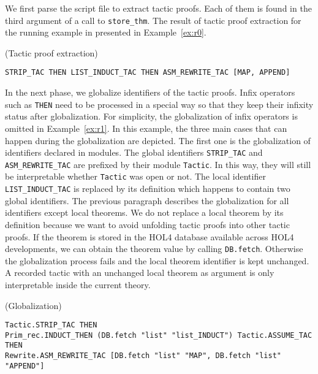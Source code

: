\documentclass[runningheads,a4paper,draft]{svjour3}
\def\holfour{\textsf{HOL4}\xspace}
\begin{document}
We first parse the script file to extract tactic proofs. Each of them is found in
the third argument of a call to \texttt{store\_thm}. The result of tactic proof
extraction for the running example in presented in Example~\ref{ex:r0}.

\begin{example}\label{ex:r0}(Tactic proof extraction)
\small
\begin{lstlisting}[language=SMLSmall]
STRIP_TAC THEN LIST_INDUCT_TAC THEN ASM_REWRITE_TAC [MAP, APPEND]
\end{lstlisting}
\end{example}

In the next phase, we globalize identifiers of the tactic proofs.
Infix operators such as \texttt{THEN} need to be processed in a special way so
that they keep their infixity status after globalization. For simplicity,
the
globalization of infix operators is omitted in Example~\ref{ex:r1}.
In this example, the three main cases that can happen during the globalization
are depicted. The first one is the globalization of identifiers declared in
modules. The global identifiers \texttt{STRIP\_TAC} and
\texttt{ASM\_REWRITE\_TAC} are prefixed by their module \texttt{Tactic}. In
this way, they will still be interpretable whether \texttt{Tactic} was open or
not. The local identifier \texttt{LIST\_INDUCT\_TAC} is replaced by its
definition which happens to contain two global identifiers.
The previous paragraph describes the globalization for all identifiers except
local theorems.  We do not replace a local
theorem by its definition because we want to avoid unfolding tactic proofs into
other tactic proofs.
If the theorem is stored in the \holfour database available across \holfour
developments, we can obtain the theorem value by calling \texttt{DB.fetch}.
Otherwise the globalization process fails and the local theorem identifier is
kept unchanged. A recorded tactic with an unchanged local theorem as argument
is only interpretable inside the current theory.

\begin{example}\label{ex:r1} (Globalization)
\begin{lstlisting}[language=SMLSmall]
Tactic.STRIP_TAC THEN
Prim_rec.INDUCT_THEN (DB.fetch "list" "list_INDUCT") Tactic.ASSUME_TAC THEN
Rewrite.ASM_REWRITE_TAC [DB.fetch "list" "MAP", DB.fetch "list" "APPEND"]
\end{lstlisting}
\end{example}
\end{document}
